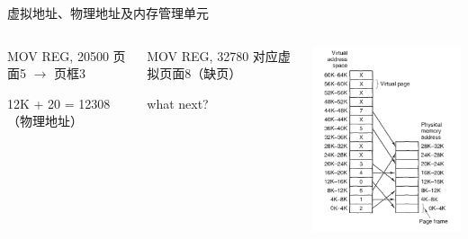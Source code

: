 \documentclass[xcolor=svgnames]{beamer}
\begin{document}
\begin{CJK*}{UTF8}{gbsn}
\begin{frame}{虚拟地址、物理地址及内存管理单元}
\begin{columns}
\begin{block}{MOV REG, 20500}
页面5 $\rightarrow$ 页框3

12K + 20 = 12308（物理地址）
\end{block}
\begin{block}{MOV REG, 32780}
对应虚拟页面8（缺页）

\alert{what next?}
\end{block}
\includegraphics[width=1.0\textwidth]{vm.png}
\end{columns}%
\end{frame}


\end{CJK*}
\end{document}
